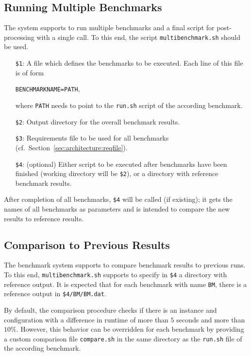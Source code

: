\documentclass[a4paper]{article}
\begin{document}
		\subsection{Running Multiple Benchmarks}
		\label{sec:advanced:multiple}
					
			The system supports to run multiple benchmarks and a final script for post-processing with a single call.
			To this end, the script {\tt multibenchmark.sh} should be used.

			\medskip{}
			\begin{itemize}
				\item[{\tt \$1}:] A file which defines the benchmarks to be executed.
					Each line of this file is of form
					\begin{center}
						{\tt BENCHMARKNAME=PATH},
					\end{center}
					where {\tt PATH} needs to point to the {\tt run.sh} script of the according benchmark.
				\item[{\tt \$2}:] Output directory for the overall benchmark results.
				\item[{\tt \$3}:] Requirements file to be used for all benchmarks (cf.~Section~\ref{sec:architecture:reqfile}).
				\item[{\tt \$4}:] (optional) Either script to be executed after benchmarks have been finished (working directory will be {\tt \$2}),
				    or a directory with reference benchmark results.
			\end{itemize}
			
			After completion of all benchmarks, {\tt \$4} will be called (if existing); it gets the names of all benchmarks as parameters
			and is intended to compare the new results to reference results.
					
		\subsection{Comparison to Previous Results}
					
			The benchmark system supports to compare benchmark results
			to previous runs.
			To this end, {\tt multibenchmark.sh}
			supports to specify in {\tt \$4} a directory with reference output.
			It is expected that for each benchmark with name {\tt BM},
			there is a reference output in {\tt \$4/BM/BM.dat}.
			
			By default, the comparison procedure checks if there is an
			instance and configuration with a difference in runtime of more than $5$ seconds and more than $10\%$.
			However, this behavior can be overridden for each benchmark
			by providing a custom comparison file {\tt compare.sh}
			in the same directory as the {\tt run.sh} file of the according benchmark.
			
\end{document}

